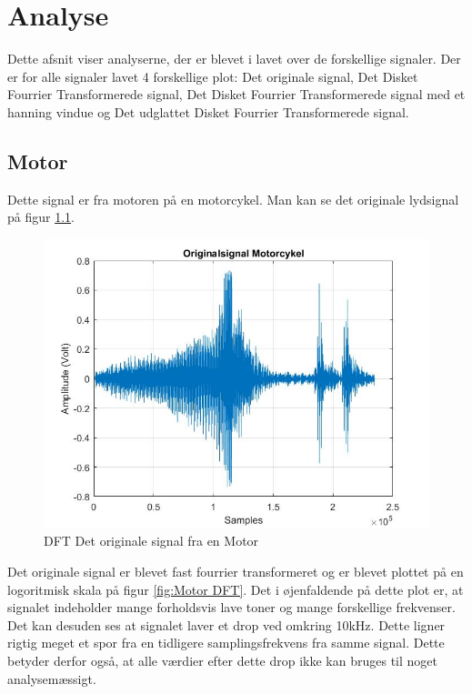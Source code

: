 \chapter{Analyse}\label{ch:analyse}
Dette afsnit viser analyserne, der er blevet i lavet over de forskellige signaler. Der er for alle signaler lavet 4 forskellige plot: Det originale signal, Det Disket Fourrier Transformerede signal, Det Disket Fourrier Transformerede signal med et hanning vindue og Det udglattet Disket Fourrier Transformerede signal.


\section{Motor}
Dette signal er fra motoren på en motorcykel. Man kan se det originale lydsignal på figur \ref{fig:Motor original}.
\begin{figure}[H]
	\centering
	\includegraphics[width=120mm]{figures/Motor/original.jpg}
	\caption{DFT Det originale signal fra en Motor}
	\label{fig:Motor original}
\end{figure}

Det originale signal er blevet fast fourrier transformeret og er blevet plottet på en logoritmisk skala på figur \ref{fig:Motor DFT}. Det i øjenfaldende på dette plot er, at signalet indeholder mange forholdsvis lave toner og  mange forskellige frekvenser. Det kan desuden ses at signalet laver et drop ved omkring 10kHz. Dette ligner rigtig meget et spor fra en tidligere samplingsfrekvens fra samme signal. Dette betyder derfor også, at alle værdier efter dette drop ikke kan bruges til noget analysemæssigt.

